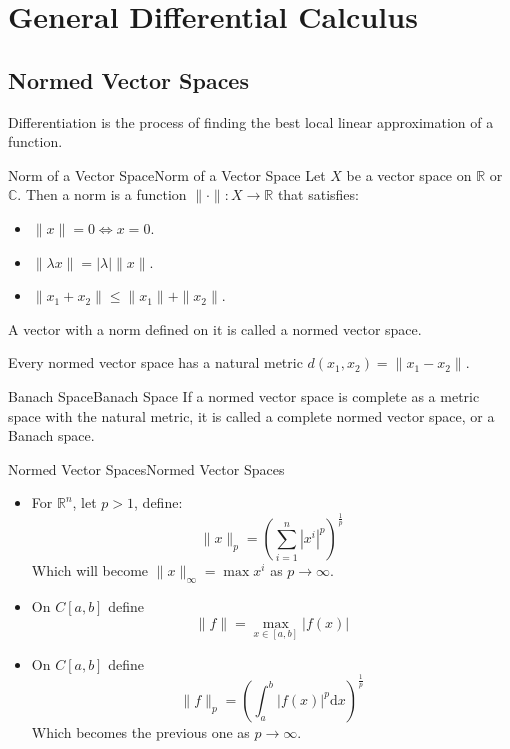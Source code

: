 \documentclass[../main.tex]{subfiles}
\begin{document}
\chapter{General Differential Calculus}

\section{Normed Vector Spaces}
Differentiation is the process of finding the best local linear approximation of a function.

\begin{definition}{Norm of a Vector Space}{Norm of a Vector Space}
Let $X$ be a vector space on $\mathbb{R}$ or $\mathbb{C}$. Then a norm is a function $\|\cdot \| : X \rightarrow \mathbb{R}$ that satisfies:
\begin{itemize}
\item $\|x\|=0 \Leftrightarrow x=0$.
\item $\| \lambda x\| = \left|\lambda\right| \|x\|$.
\item $\|x_1+x_2\| \leq \|x_1\|+\|x_2\|$.
\end{itemize}
A vector with a norm defined on it is called a normed vector space.
\end{definition}

Every normed vector space has a natural metric $d(x_1,x_2) = \|x_1-x_2\|$.

\begin{definition}{Banach Space}{Banach Space}
If a normed vector space is complete as a metric space with the natural metric, it is called a complete normed vector space, or a Banach space.
\end{definition}

\begin{example}{Normed Vector Spaces}{Normed Vector Spaces}
\begin{itemize}
\item For  $\mathbb{R}^{n}$, let $p>1$, define:
	\begin{equation*}
	\|x\|_{p} = \left(\sum_{i=1}^{n} \left|x^i\right|^p\right)^{\frac{1}{p}}
	\end{equation*}
	Which will become $\|x\|_{\infty } = \max x^i$ as $p \rightarrow \infty $.
\item On $C[a,b]$ define
	\begin{equation*}
		\|f\| = \max _{x\in [a,b]} \left|f(x)\right|
	\end{equation*}
\item On $C[a,b]$ define
	\begin{equation*}
	\|f\|_{p} = \left( \int _a^b \left|f(x)\right|^p\mathrm{d}x\right)^{\frac{1}{p}}
	\end{equation*}
	Which becomes the previous one as $p \rightarrow \infty $.
\end{itemize}
\end{example}
\end{document}
